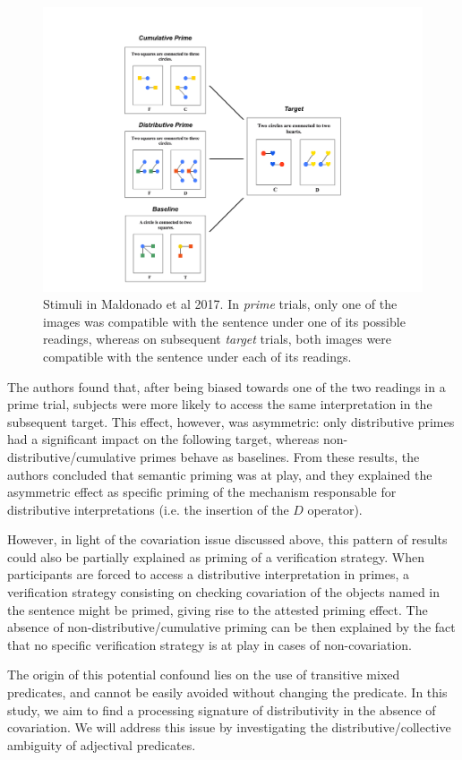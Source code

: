 \documentclass[a4paper, 11pt]{article}
\begin{document}
\begin{figure}[htbp]
\begin{center}
 \includegraphics[width=.6\textwidth]{tablealternative.pdf}
\caption{Stimuli in Maldonado et al 2017. In \emph{prime} trials, only one of the images was compatible with the sentence under one of its possible readings, whereas on subsequent \emph{target} trials, both images were compatible with the sentence under each of its readings.}
\label{fig:example.maldonado2017}
\end{center}
\end{figure}

The authors found that, after being biased towards one of the two readings in a prime trial, subjects were more likely to access the same interpretation in the subsequent target. This effect, however, was asymmetric: only distributive primes had a significant impact on the following target, whereas non-distributive/cumulative primes behave as baselines. From these results, the authors concluded that semantic priming was at play, and they explained the asymmetric effect as specific priming of the mechanism responsable for distributive interpretations (i.e. the insertion of the $D$ operator).

However, in light of the covariation issue discussed above, this pattern of results could also be partially explained as priming of a verification strategy. When participants are forced to access a distributive interpretation in primes, a verification strategy consisting on checking covariation of the objects named in the sentence might be primed, giving rise to the attested priming effect. The absence of non-distributive/cumulative priming can be then explained by the fact that no specific verification strategy is at play in cases of non-covariation. 

The origin of this potential confound lies on the use of transitive mixed predicates, and cannot be easily avoided without changing the predicate. In this study, we aim to find a processing signature of distributivity in the absence of covariation. We will address this issue by investigating the distributive/collective ambiguity of adjectival predicates. 
\end{document}
